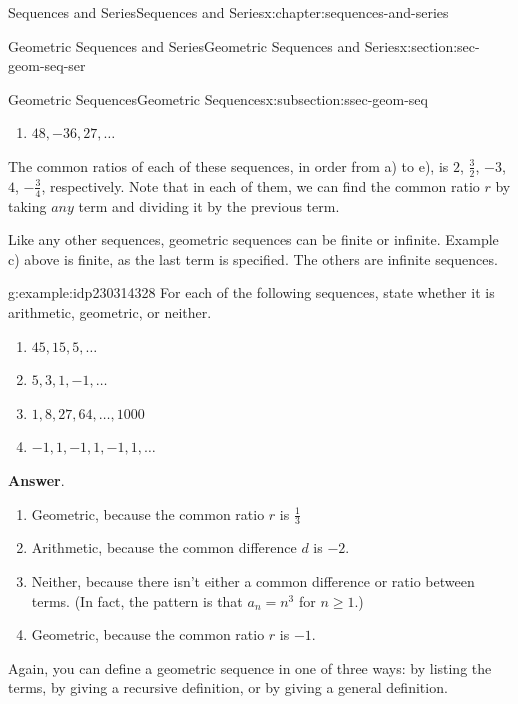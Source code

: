 \documentclass[twoside,10pt,]{book}
\newcommand{\blocktitlefont}{\relax}
\numberwithin{equation}{section}
\begin{document}
\begin{chapterptx}{Sequences and Series}{}{Sequences and Series}{}{}{x:chapter:sequences-and-series}
\begin{sectionptx}{Geometric Sequences and Series}{}{Geometric Sequences and Series}{}{}{x:section:sec-geom-seq-ser}
\begin{subsectionptx}{Geometric Sequences}{}{Geometric Sequences}{}{}{x:subsection:ssec-geom-seq}
\begin{enumerate}[label=(\alph*)]
\item{}\(\displaystyle 48, -36, 27, \ldots\)%
\end{enumerate}
%
\par
The common ratios of each of these sequences, in order from a) to e), is \(2\), \(\frac{3}{2}\), \(-3\), \(4\), \(-\frac{3}{4}\), respectively.  Note that in each of them, we can find the common ratio \(r\) by taking \(any\) term and dividing it by the previous term.%
\par
Like any other sequences, geometric sequences can be finite or infinite.  Example c) above is finite, as the last term is specified.  The others are infinite sequences. \begin{example}{}{g:example:idp230314328}%
For each of the following sequences, state whether it is arithmetic, geometric, or neither. %
\begin{enumerate}[label=(\alph*)]
\item{}\(\displaystyle 45, 15, 5, \ldots\)%
\item{}\(\displaystyle 5, 3, 1, -1, \ldots\)%
\item{}\(\displaystyle 1, 8, 27, 64, \ldots , 1000\)%
\item{}\(\displaystyle -1, 1, -1, 1, -1, 1, \ldots\)%
\end{enumerate}
\par\smallskip%
\noindent\textbf{\blocktitlefont Answer}.\label{g:answer:idp230321368}{}\hypertarget{g:answer:idp230321368}{}\quad{}%
\begin{enumerate}[label=(\alph*)]
\item{}Geometric, because the common ratio \(r\) is \(\frac{1}{3}\)%
\item{}Arithmetic, because the common difference \(d\) is \(-2\).%
\item{}Neither, because there isn't either a common difference or ratio between terms.  (In fact, the pattern is that \(a_n = n^3\) for \(n \ge 1\).)%
\item{}Geometric, because the common ratio \(r\) is \(-1\).%
\end{enumerate}
\end{example}
%
\par
Again, you can define a geometric sequence in one of three ways:  by listing the terms, by giving a recursive definition, or by giving a general definition.%
\end{subsectionptx}
%
%
\typeout{************************************************}

\end{sectionptx}
\end{chapterptx}
\end{document}
